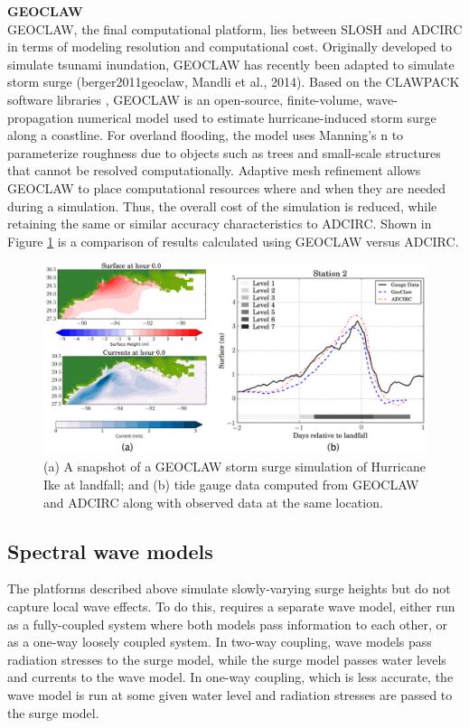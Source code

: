 \noindent\textbf{GEOCLAW} \\GEOCLAW, the final computational platform, lies between SLOSH and ADCIRC in terms of modeling resolution and computational cost. Originally developed to simulate tsunami inundation, GEOCLAW has recently been adapted to simulate storm surge (berger2011geoclaw, Mandli et al., 2014). Based on the CLAWPACK software libraries \citep{leveque2002finite}, GEOCLAW is an open-source, finite-volume, wave-propagation numerical model used to estimate hurricane-induced storm surge along a coastline. For overland flooding, the model uses Manning's n to parameterize roughness due to objects such as trees and small-scale structures that cannot be resolved computationally. Adaptive mesh refinement allows GEOCLAW to place computational resources where and when they are needed during a simulation. Thus, the overall cost of the simulation is reduced, while retaining the same or similar accuracy characteristics to ADCIRC. Shown in Figure \ref{fig:GEOCLAW_ADCIRC_comparison} is a comparison of results calculated using GEOCLAW versus ADCIRC. 

\begin{figure}[htb]
    \centering
    \includegraphics[width=1.0\textwidth, angle = 0]{Figures/GEOCLAW_ADCIRC_comparison.png}
    \caption{(a) A snapshot of a GEOCLAW storm surge simulation of Hurricane Ike at landfall; and (b) tide gauge data computed from GEOCLAW and ADCIRC along with observed data at the same location. \citep{mandli2016clawpack}}
    \label{fig:GEOCLAW_ADCIRC_comparison}
\end{figure}

\subsection{Spectral wave models}

The platforms described above simulate slowly-varying surge heights but do not capture local wave effects. To do this, requires a separate wave model, either run as a fully-coupled system where both models pass information to each other, or as a one-way loosely coupled system. In two-way coupling, wave models pass radiation stresses to the surge model, while the surge model passes water levels and currents to the wave model. In one-way coupling, which is less accurate, the wave model is run at some given water level and radiation stresses are passed to the surge model.

